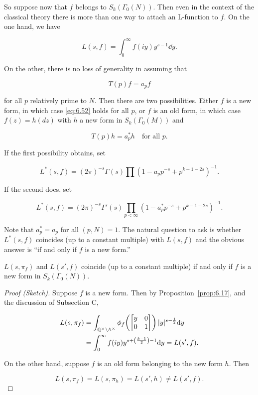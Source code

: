 So suppose now that $f$ belongs to $S_k(\Gamma_0(N))$. Then even in the context of the classical theory there is more than one way to attach an L-function to $f$. On the one hand, we have

\[
L(s, f) = \int_0^{\infty} f(iy) y^{s-1} \dd y.
\]

On the other, there is no loss of generality in assuming that

\begin{equation}\label{eq:6.52}
T(p)f = a_p f\tag{6.52}
\end{equation}

for all $p$ relatively prime to $N$. Then there are two possibilities. Either $f$ is a new form, in which case \eqref{eq:6.52} holds for all $p$, or $f$ is an old form, in which case $f(z) = h(dz)$ with $h$ a new form in $S_k(\Gamma_0(M))$ and

\[
T(p)h = a_p^{*} h \quad \text{for all } p.
\]

If the first possibility obtains, set

\[
L^*(s, f) = (2\pi)^{-s}\Gamma(s) \prod \left(1 - a_p p^{-s} + p^{k-1-2s}\right)^{-1}.
\]

If the second does, set

\[
L^*(s, f) = (2\pi)^{-s}\Gamma'(s) \prod_{p < \infty} \left(1 - a_p^{*} p^{-s} + p^{k-1-2s}\right)^{-1}.
\]

Note that $a_p^{*} = a_p$ for all $(p, N) = 1$. The natural question to ask is whether $L^*(s, f)$ coincides (up to a constant multiple) with $L(s, f)$ and the obvious answer is ``if and only if $f$ is a new form.''

\begin{proposition}\label{prop:6.21}

$L(s, \pi_f)$ and $L(s', f)$ coincide (up to a constant multiple) if and only if $f$ is a new form in $S_k(\Gamma_0(N))$.

\end{proposition}

\begin{proof}[Proof (Sketch)]

Suppose $f$ is a new form. Then by Proposition~\ref{prop:6.17}, and the discussion of Subsection C,

\[
\begin{aligned}
L(s, \pi_f) &= \int_{\mathbb{Q}^{\times} \backslash \mathbb{A}^{\times}} \phi_f\!\left(\begin{bmatrix} y & 0 \\ 0 & 1 \end{bmatrix}\right) |y|^{s - \frac{1}{2}} \mathrm{d} y\\
&= \int_0^{\infty} f(iy) y^{s + \left(\frac{k-1}{2}\right) - 1} \mathrm{d} y = L(s', f).
\end{aligned}
\]

On the other hand, suppose $f$ is an old form belonging to the new form $h$. Then

\[
L(s, \pi_f) = L(s, \pi_h) = L(s', h) \neq L(s', f).
\]

\end{proof}


